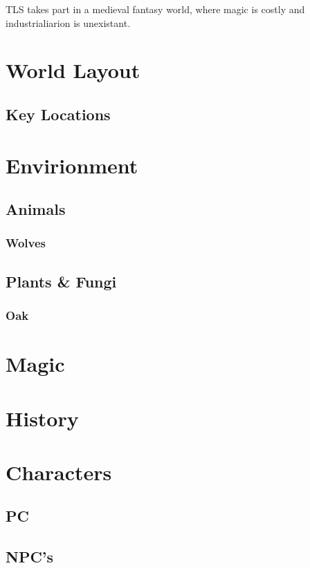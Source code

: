 \documentclass[a4paper]{report}
\begin{document}
		TLS takes part in a medieval fantasy world, where magic is costly and industrialiarion is unexistant.

	\chapter{World Layout}

		\section{Key Locations}

	\chapter{Envirionment}

		\section{Animals}

			\subsection{Wolves}

		\section{Plants \& Fungi}

			\subsection{Oak}

	\chapter{Magic}

	\chapter{History}

	\chapter{Characters}

		\section{PC}

		\section{NPC's}
\end{document}
